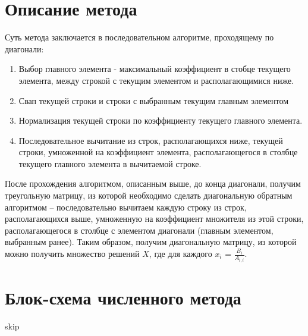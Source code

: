 \thispagestyle{empty}
\BgThispage
\section{Описание метода} \par
Суть метода заключается в последовательном алгоритме, проходящему по диагонали:
\begin{enumerate}
    \item Выбор главного элемента - максимальный коэффициент в стобце текущего элемента, между строкой с текущим элементом и располагающимися ниже.
    \item Свап текущей строки и строки с выбранным текущим главным элементом
    \item Нормализация текущей строки по коэффициенту текущего главного элемента.
    \item Последовательное вычитание из строк, располагающихся ниже, текущей строки, умноженной на коэффициент элемента, располагающегося в столбце текущего главного элемента в вычитаемой строке.
\end{enumerate}
После прохождения алгоритмом, описанным выше, до конца диагонали, получим треугольную матрицу, из которой необходимо сделать диагональную обратным алгоритмом -- последовательно вычитаем каждую строку из строк, располагающихся выше, умноженную на коэффициент множителя из этой строки, располагающегося в столбце с элементом диагонали (главным элементом, выбранным ранее).
Таким образом, получим диагональную матрицу, из которой можно получить множество решений $X$, где для каждого $x_{i}$ = $\frac{B_{i}}{A_{i,i}}$.
\newpage
\thispagestyle{empty}
\BgThispage
\section{Блок-схема численного метода}
skip\\
\newpage
\thispagestyle{empty}
\BgThispage
